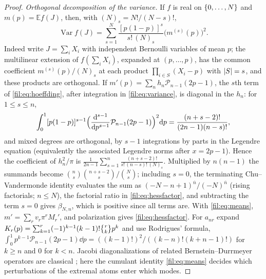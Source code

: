 \begin{proof}
\emph{Orthogonal decomposition of the variance.} If $f$ is real on $\{0,\dots,N\}$ and $m(p)=\mathbb Ef(J)$, then,
with $(N)_s=N!/(N-s)!$,
\begin{equation}\label{fil:eq:hoeffding}
 \operatorname{Var}f(J)=\sum_{s=1}^N\frac{[p(1-p)]^s}{s!\,(N)_s}\bigl(m^{(s)}(p)\bigr)^2 .
\end{equation}
Indeed write $J=\sum_iX_i$ with independent Bernoulli variables of mean $p$; the multilinear extension of
$f(\sum_iX_i)$, expanded at $(p,\dots,p)$, has the common coefficient $m^{(s)}(p)/(N)_s$ at each product
$\prod_{i\in S}(X_i-p)$ with $\lvert S\rvert=s$, and these products are orthogonal. If $m'(p)=\sum_nh_n\mathcal P_{n-1}(2p-1)$, the
$s$th term of \eqref{fil:eq:hoeffding}, after integration in \eqref{fil:eq:variance}, is diagonal in the $h_n$: for
$1\le s\le n$,
\[
 \int_0^1[p(1-p)]^{s-1}\Bigl(\frac{\mathrm{d}^{s-1}}{\mathrm{d} p^{s-1}}\mathcal P_{n-1}(2p-1)\Bigr)^2\mathrm{d} p=\frac{(n+s-2)!}{(2n-1)(n-s)!},
\]
and mixed degrees are orthogonal, by $s-1$ integrations by parts in the Legendre equation (equivalently the
associated Legendre norms after $x=2p-1$). Hence the coefficient of $h_n^2/\pi$ is
$\frac1{2n-1}\sum_{s=1}^n\frac{(n+s-2)!}{s!\,(n-s)!\,(N)_s}$. Multiplied by $n(n-1)$ the summands become
$\binom ns\binom{n+s-2}s/\binom Ns$; including $s=0$, the terminating Chu--Vandermonde identity evaluates the sum as
$(-N-n+1)^{\overline n}/(-N)^{\overline n}$ (rising factorials; $n\le N$), the factorial ratio in \eqref{fil:eq:hessfactor},
and subtracting the term $s=0$ gives $\beta_{N,n}$, which is positive since all terms are. With \eqref{fil:eq:means},
$m'=\sum_rv_r\pi^rM_r'$, and polarization gives \eqref{fil:eq:hessfactor}. For $a_{nr}$ expand
$K_r(p)=\sum_{k=1}^r(-1)^{k-1}(k-1)!\filStir rkp^k$ and use Rodrigues' formula,
$\int_0^1p^{k-1}\mathcal P_{n-1}(2p-1)\dd p=((k-1)!)^2/((k-n)!(k+n-1)!)$ for $k\ge n$ and $0$ for $k<n$. Jacobi
diagonalizations of related Bernstein--Durrmeyer operators are classical \cite{Waldron2003Generalised}; here the
cumulant identity \eqref{fil:eq:means} decides which perturbations of the extremal atoms enter which modes.


\end{proof}
